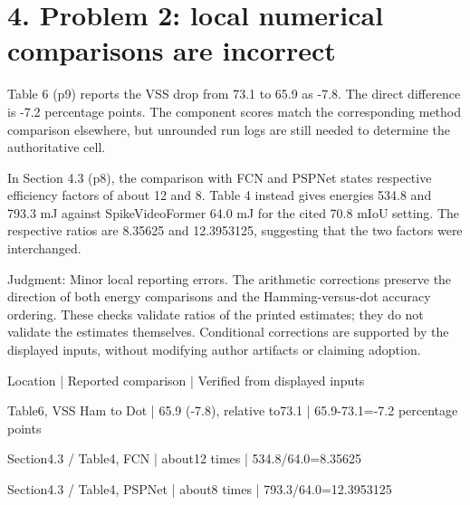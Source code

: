 \documentclass[10pt]{article}
\begin{document}
\section*{4. Problem 2: local numerical comparisons are incorrect}
Table 6 (p9) reports the VSS drop from 73.1 to 65.9 as -7.8. The direct difference is -7.2 percentage points. The component scores match the corresponding method comparison elsewhere, but unrounded run logs are still needed to determine the authoritative cell.\par
In Section 4.3 (p8), the comparison with FCN and PSPNet states respective efficiency factors of about 12 and 8. Table 4 instead gives energies 534.8 and 793.3 mJ against SpikeVideoFormer 64.0 mJ for the cited 70.8 mIoU setting. The respective ratios are 8.35625 and 12.3953125, suggesting that the two factors were interchanged.\par
Judgment: Minor local reporting errors. The arithmetic corrections preserve the direction of both energy comparisons and the Hamming-versus-dot accuracy ordering. These checks validate ratios of the printed estimates; they do not validate the estimates themselves. Conditional corrections are supported by the displayed inputs, without modifying author artifacts or claiming adoption.\par
Location | Reported comparison | Verified from displayed inputs\par
Table6, VSS Ham to Dot | 65.9 (-7.8), relative to73.1 | 65.9-73.1=-7.2 percentage points\par
Section4.3 / Table4, FCN | about12 times | 534.8/64.0=8.35625\par
Section4.3 / Table4, PSPNet | about8 times | 793.3/64.0=12.3953125\par
\end{document}
